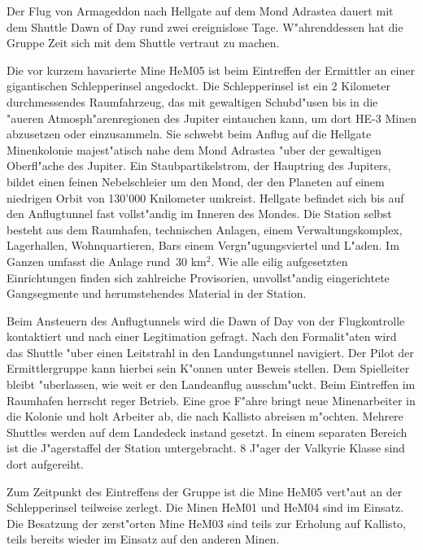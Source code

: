 \newpage
\null
{}

Der Flug von Armageddon nach Hellgate auf dem Mond Adrastea dauert mit dem Shuttle Dawn of Day rund zwei ereignislose Tage. W"ahrenddessen hat die Gruppe Zeit sich mit dem Shuttle vertraut zu machen. 

Die vor kurzem havarierte Mine HeM05 ist beim Eintreffen der Ermittler an einer gigantischen Schlepperinsel  angedockt. Die Schlepperinsel ist ein 2 Kilometer durchmessendes Raumfahrzeug, das mit gewaltigen Schubd"usen bis in die "au\3eren Atmosph"arenregionen des Jupiter eintauchen kann, um dort HE-3 Minen abzusetzen oder einzusammeln. Sie schwebt beim Anflug auf die Hellgate Minenkolonie majest"atisch nahe dem Mond Adrastea "uber der gewaltigen Oberfl"ache des Jupiter. Ein Staubpartikelstrom, der Hauptring des Jupiters, bildet einen feinen Nebelschleier um den Mond, der den Planeten auf einem niedrigen Orbit von 130'000 Knilometer umkreist. Hellgate befindet sich bis auf den Anflugtunnel fast vollst"andig im Inneren des Mondes. Die Station selbst besteht aus dem Raumhafen, technischen Anlagen, einem Verwaltungskomplex, Lagerhallen, Wohnquartieren, Bars einem Vergn"ugungsviertel und L"aden. Im Ganzen umfasst die Anlage rund~30 km$^{2}$. Wie alle eilig aufgesetzten Einrichtungen finden sich zahlreiche Provisorien, unvollst"andig eingerichtete Gangsegmente und herumstehendes Material in der Station.

Beim Ansteuern des Anflugtunnels wird die Dawn of Day von der Flugkontrolle kontaktiert und nach einer Legitimation gefragt. Nach den  Formalit"aten wird das Shuttle "uber einen Leitstrahl in den Landungstunnel navigiert. Der Pilot der Ermittlergruppe kann hierbei sein K"onnen unter Beweis stellen. Dem Spielleiter bleibt "uberlassen, wie weit er den Landeanflug ausschm"uckt. Beim Eintreffen im Raumhafen herrscht reger Betrieb. Eine gro\3e F"ahre bringt neue Minenarbeiter in die Kolonie und holt Arbeiter ab, die nach Kallisto abreisen m"ochten. Mehrere Shuttles werden auf dem Landedeck instand gesetzt. In einem separaten Bereich ist die J"agerstaffel der Station untergebracht. 8 J"ager der Valkyrie Klasse sind dort aufgereiht. 

Zum Zeitpunkt des Eintreffens der Gruppe ist die Mine HeM05 vert"aut an der Schlepperinsel teilweise zerlegt. Die Minen HeM01 und HeM04 sind im Einsatz. Die Besatzung der zerst"orten Mine HeM03 sind teils zur Erholung auf Kallisto, teils bereits wieder im Einsatz auf den anderen Minen.

